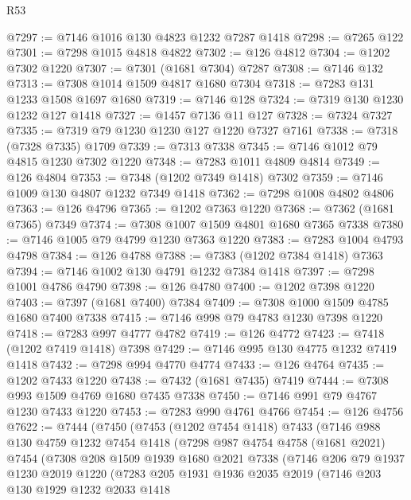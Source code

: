 \begin{lexlean}{R53}
\begin{coremodule}
@7297 := @7146 @1016 @130 @4823 @1232 @7287 @1418
@7298 := @7265 @122
@7301 := @7298 @1015 @4818 @4822
@7302 := @126 @4812
@7304 := @1202 @7302 @1220
@7307 := @7301 (@1681 @7304) @7287
@7308 := @7146 @132
@7313 := @7308 @1014 @1509 @4817 @1680 @7304
@7318 := @7283 @131 @1233 @1508 @1697 @1680
@7319 := @7146 @128
@7324 := @7319 @130 @1230 @1232 @127 @1418
@7327 := @1457 @7136 @11 @127
@7328 := @7324 @7327
@7335 := @7319 @79 @1230 @1230 @127 @1220 @7327 @7161
@7338 := @7318 (@7328 @7335) @1709
@7339 := @7313 @7338
@7345 := @7146 @1012 @79 @4815 @1230 @7302 @1220
@7348 := @7283 @1011 @4809 @4814
@7349 := @126 @4804
@7353 := @7348 (@1202 @7349 @1418) @7302
@7359 := @7146 @1009 @130 @4807 @1232 @7349 @1418
@7362 := @7298 @1008 @4802 @4806
@7363 := @126 @4796
@7365 := @1202 @7363 @1220
@7368 := @7362 (@1681 @7365) @7349
@7374 := @7308 @1007 @1509 @4801 @1680 @7365 @7338
@7380 := @7146 @1005 @79 @4799 @1230 @7363 @1220
@7383 := @7283 @1004 @4793 @4798
@7384 := @126 @4788
@7388 := @7383 (@1202 @7384 @1418) @7363
@7394 := @7146 @1002 @130 @4791 @1232 @7384 @1418
@7397 := @7298 @1001 @4786 @4790
@7398 := @126 @4780
@7400 := @1202 @7398 @1220
@7403 := @7397 (@1681 @7400) @7384
@7409 := @7308 @1000 @1509 @4785 @1680 @7400 @7338
@7415 := @7146 @998 @79 @4783 @1230 @7398 @1220
@7418 := @7283 @997 @4777 @4782
@7419 := @126 @4772
@7423 := @7418 (@1202 @7419 @1418) @7398
@7429 := @7146 @995 @130 @4775 @1232 @7419 @1418
@7432 := @7298 @994 @4770 @4774
@7433 := @126 @4764
@7435 := @1202 @7433 @1220
@7438 := @7432 (@1681 @7435) @7419
@7444 := @7308 @993 @1509 @4769 @1680 @7435 @7338
@7450 := @7146 @991 @79 @4767 @1230 @7433 @1220
@7453 := @7283 @990 @4761 @4766
@7454 := @126 @4756
@7622 := @7444
    (@7450
      (@7453
        (@1202 @7454 @1418)
        @7433
        (@7146
          @988
          @130
          @4759
          @1232
          @7454
          @1418
          (@7298
            @987
            @4754
            @4758
            (@1681 @2021)
            @7454
            (@7308
              @208
              @1509
              @1939
              @1680
              @2021
              @7338
              (@7146
                @206
                @79
                @1937
                @1230
                @2019
                @1220
                (@7283
                  @205
                  @1931
                  @1936
                  @2035
                  @2019
                  (@7146
                    @203
                    @130
                    @1929
                    @1232
                    @2033
                    @1418

\end{coremodule}
\end{lexlean}
